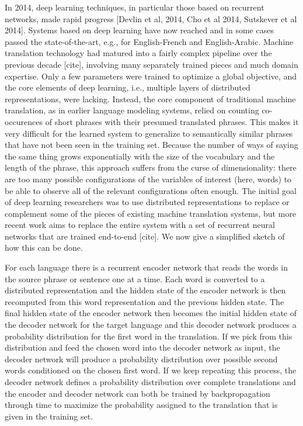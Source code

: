\documentclass{article} %
\begin{document}
In 2014, deep learning techniques, in particular those based on recurrent
networks, made rapid progress [Devlin et al, 2014, Cho et al 2014,
  Sutskever et al 2014]. Systems based on deep learning have now reached
and in some cases passed the state-of-the-art, e.g., for English-French and
English-Arabic. Machine translation technology had matured into a fairly
complex pipeline over the previous decade [cite], involving many separately
trained pieces and much domain expertise. Only a few parameters were
trained to optimize a global objective, and the core elements of deep
learning, i.e., multiple layers of distributed representations, were
lacking. Instead, the core component of traditional machine translation, as
in earlier language modeling systems, relied on counting co-occurences of
short phrases with their presumed translated phrases. This makes it very
difficult for the learned system to generalize to semantically similar
phrases that have not been seen in the training set. Because the number of
ways of saying the same thing grows exponentially with the size of the
vocabulary and the length of the phrase, this approach suffers from the
curse of dimensionality: there are too many possible configurations of the
variables of interest (here, words) to be able to observe all of the
relevant configurations often enough. The initial goal of deep learning
researchers was to use distributed representations to replace or complement
some of the pieces of existing machine translation systems, but more recent
work aims to replace the entire system with a set of recurrent neural
networks that are trained end-to-end [cite]. We now give a simplified
sketch of how this can be done.


For each language there is a recurrent encoder network that reads the words
in the source phrase or sentence one at a time. Each word is converted to a
distributed representation and the hidden state of the encoder network is
then recomputed from this word representation and the previous hidden
state. The final hidden state of the encoder network then becomes the
initial hidden state of the decoder network for the target language and
this decoder network produces a probability distribution for the first word
in the translation. If we pick from this distribution and feed the chosen
word into the decoder network as input, the decoder network will produce a
probability distribution over possible second words conditioned on the
chosen first word. If we keep repeating this process, the decoder network
defines a probability distribution over complete translations and the
encoder and decoder network can both be trained by backpropagation through
time to maximize the probability assigned to the translation that is given
in the training set.
\end{document}
